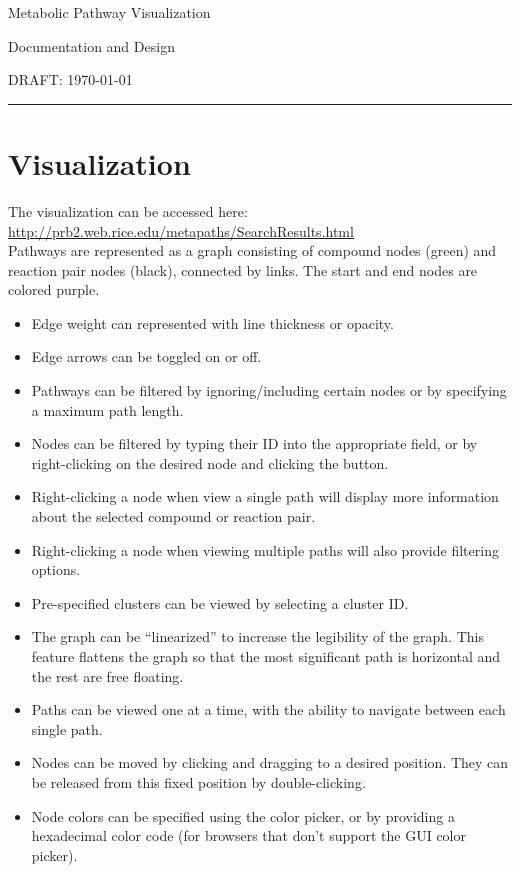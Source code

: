 \documentclass{article}
\begin{document}
	\begin{center}
		\doublespacing

		\LARGE{Metabolic Pathway Visualization}

		\Large{Documentation and Design}

		\large{DRAFT: \today}

		\rule{6.5in}{0.75pt}
	\end{center}

	\tableofcontents
	\onehalfspace

	\section{Visualization} %
	\label{sec:visualization}
		\noindent The visualization can be accessed here:
		\url{http://prb2.web.rice.edu/metapaths/SearchResults.html} \\

		\noindent Pathways are represented as a graph consisting of compound
		nodes (green) and reaction pair nodes (black), connected by links.
		The start and end nodes are colored purple.

		\begin{itemize}
			\item{Edge weight can represented with line thickness or opacity.}
			\item{Edge arrows can be toggled on or off.}
			\item{Pathways can be filtered by ignoring/including certain nodes
				or by specifying a maximum path length.}
			\item{Nodes can be filtered by typing their ID into the appropriate
				field, or by right-clicking on the desired node and clicking
				the button.}
			\item{Right-clicking a node when view a single path will display
				more information about the selected compound or reaction pair.}
			\item{Right-clicking a node when viewing multiple paths will
				also provide filtering options.}
			\item{Pre-specified clusters can be viewed by selecting a cluster
				ID.}
			\item{The graph can be ``linearized'' to increase the legibility of
			the graph. This feature flattens the graph so that the most
			significant path is horizontal and the rest are free floating.}
			\item{Paths can be viewed one at a time, with the ability to
				navigate between each single path.}
			\item{Nodes can be moved by clicking and dragging to a desired
				position. They can be released from this fixed position by
				double-clicking.}
			\item{Node colors can be specified using the color picker, or by
				providing a hexadecimal color code (for browsers that don't 
				support the GUI color picker).}
		\end{itemize}
\end{document}
